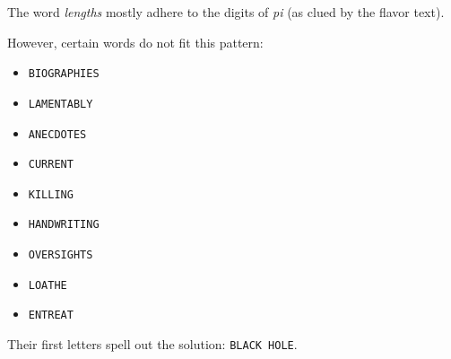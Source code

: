 The word \textit{lengths} mostly adhere to the digits of
\textit{pi} (as clued by the flavor text).

However, certain words do not fit this pattern:
\begin{itemize}
\item \texttt{BIOGRAPHIES}
\item \texttt{LAMENTABLY}
\item \texttt{ANECDOTES}
\item \texttt{CURRENT}
\item \texttt{KILLING}
\item \texttt{HANDWRITING}
\item \texttt{OVERSIGHTS}
\item \texttt{LOATHE}
\item \texttt{ENTREAT} 
\end{itemize}

Their first letters spell out the solution: \texttt{BLACK HOLE}.
